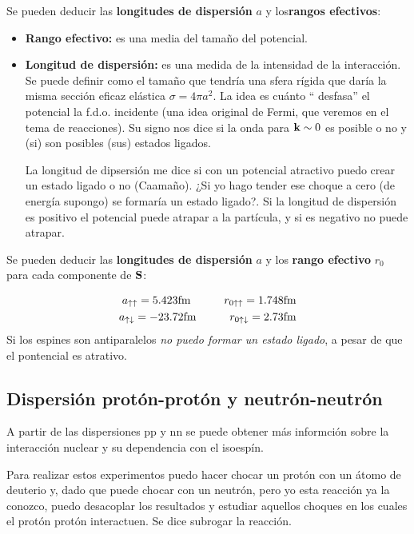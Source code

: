 Se pueden deducir las {\bf longitudes de dispersión} $a$ y  los{\bf rangos efectivos}: 

\begin{itemize}
    \item \textbf{Rango efectivo:} es una media del tamaño del potencial.
    \item \textbf{Longitud de dispersión:} es una medida de la intensidad de la interacción. Se puede definir como el tamaño que tendría una sfera rígida que daría la misma sección eficaz elástica $\sigma=4 \pi a^2$. La idea es cuánto `` desfasa'' el potencial la f.d.o. incidente (una idea original de Fermi, que veremos en el tema de reacciones). Su signo nos dice si la onda para $\mathbf{k} \sim 0$ es posible o no y (si) son posibles (sus) estados ligados. 
    
    La longitud de dipsersión me dice si con un potencial atractivo puedo crear un estado ligado o no (Caamaño). ¿Si yo hago tender ese choque a cero (de energía supongo) se formaría un estado ligado?. Si la longitud de dispersión es positivo el potencial puede atrapar a la partícula, y si es negativo no puede atrapar.
\end{itemize}

Se pueden deducir las \textbf{longitudes de dispersión} $a$ y los \textbf{rango efectivo} $r_0$ para cada componente de $\mathbf{S}$:

\begin{align}
a_{\uparrow \uparrow} = 5.423 \text{fm} \quad \quad \quad r_{0 \uparrow \uparrow} = 1.748 \text{fm} \\
a_{\uparrow \downarrow} = - 23.72 \text{fm} \quad \quad \quad r_{0 \uparrow \downarrow} = 2.73 \text{fm}
\end{align}
Si los espines son antiparalelos \textit{no puedo formar un estado ligado}, a pesar de que el pontencial es atrativo. 


\subsection{Dispersión protón-protón y neutrón-neutrón}

A partir de las dispersiones pp y nn se puede obtener más informción sobre la interacción nuclear y su dependencia con el isoespín. 

Para realizar estos experimentos puedo hacer chocar un protón con un átomo de deuterio y, dado que puede chocar con un neutrón, pero yo esta reacción ya la conozco, puedo desacoplar los resultados y estudiar aquellos choques en los cuales el protón protón interactuen. Se dice subrogar la reacción. \\

